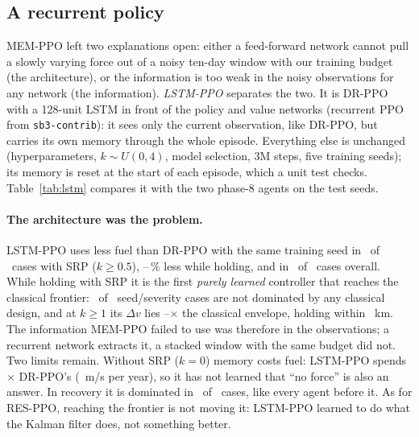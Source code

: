 \documentclass[11pt,a4paper]{article}
\newcommand{\dv}{\Delta v}
\begin{document}
\subsection{A recurrent policy}
\label{sec:lstm}

MEM-PPO left two explanations open: either a feed-forward network cannot pull
a slowly varying force out of a noisy ten-day window with our training budget
(the architecture), or the information is too weak in the noisy observations
for any network (the information). \emph{LSTM-PPO} separates the two. It is
DR-PPO with a 128-unit LSTM in front of the policy and value networks
(recurrent PPO from \texttt{sb3-contrib}): it sees only the current
observation, like DR-PPO, but carries its own memory through the whole
episode. Everything else is unchanged (hyperparameters, $k \sim U(0, 4)$, model
selection, 3M steps, five training seeds); its memory is reset at the start of
each episode, which a unit test checks. Table~\ref{tab:lstm} compares it with
the two phase-8 agents on the test seeds.

\begin{table}[t]
\centering
\caption{Recurrent PPO, test seeds 100--119: $\dv$ divided by that of the
cheapest classical design (of \mmDesigns) that is at least as accurate, mean
$\pm$ std over 5 training seeds; LSTM-PPO's $\dv$ divided by that of DR-PPO
with the same training seed; and the number of LSTM-PPO seeds that no
classical design dominates.}
\label{tab:lstm}
\small

\end{table}

\paragraph{The architecture was the problem.} LSTM-PPO uses less fuel than
DR-PPO with the same training seed in \lsPertWin\ of \lsPertCases\ cases with
SRP ($k \ge 0.5$), \lsHoldSaveMin--\lsHoldSaveMax\,\% less while holding, and
in \lsWinCases\ of \lsCases\ cases overall. While holding with SRP it is
the first \emph{purely learned} controller that reaches the classical
frontier: \lsNondom\ of \lsNondomOf\ seed/severity cases are not dominated by
any classical design, and at $k \ge 1$ its $\dv$ lies
\lsEnvMin--\lsEnvMax$\times$ the classical envelope, holding within
\lsHoldDistMax~km. The information MEM-PPO failed to use was therefore in the
observations; a recurrent network extracts it, a stacked window with the same
budget did not. Two limits remain. Without SRP ($k = 0$) memory costs fuel:
LSTM-PPO spends \lsKzeroVsDr$\times$ DR-PPO's (\lsKzeroDv~m/s per year), so it
has not learned that ``no force'' is also an answer. In recovery it is
dominated in \lsAcqDom\ of \lsAcqOf\ cases, like every agent before it. As for
RES-PPO, reaching the frontier is not moving it: LSTM-PPO learned to do what
the Kalman filter does, not something better.
\end{document}
